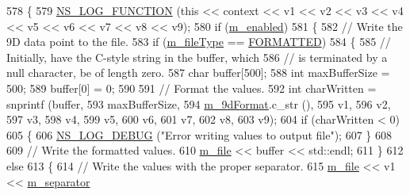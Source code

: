 \begin{DoxyCode}
578 \{
579   \hyperlink{log-macros-disabled_8h_a90b90d5bad1f39cb1b64923ea94c0761}{NS\_LOG\_FUNCTION} (\textcolor{keyword}{this} << context << v1 << v2 << v3 << v4 << v5 << v6 << v7 << v8 << v9);
580   \textcolor{keywordflow}{if} (\hyperlink{classns3_1_1DataCollectionObject_a3e8b0578f03044b1db4811ecff2be7ea}{m\_enabled})
581     \{
582       \textcolor{comment}{// Write the 9D data point to the file.}
583       \textcolor{keywordflow}{if} (\hyperlink{classns3_1_1FileAggregator_aa2a8abfe3082a802dc6705e701f73e9e}{m\_fileType} == \hyperlink{classns3_1_1FileAggregator_aedb3108205a498f7ac0c564508067e2da7e34fea5d3f680d09518ee58ce4711f0}{FORMATTED})
584         \{
585           \textcolor{comment}{// Initially, have the C-style string in the buffer, which}
586           \textcolor{comment}{// is terminated by a null character, be of length zero.}
587           \textcolor{keywordtype}{char} buffer[500];
588           \textcolor{keywordtype}{int} maxBufferSize = 500;
589           buffer[0] = 0;
590 
591           \textcolor{comment}{// Format the values.}
592           \textcolor{keywordtype}{int} charWritten = snprintf (buffer,
593                                       maxBufferSize,
594                                       \hyperlink{classns3_1_1FileAggregator_a8726cd1f40f4da37cdd544873b4ea583}{m\_9dFormat}.c\_str (),
595                                       v1,
596                                       v2,
597                                       v3,
598                                       v4,
599                                       v5,
600                                       v6,
601                                       v7,
602                                       v8,
603                                       v9);
604           \textcolor{keywordflow}{if} (charWritten < 0)
605             \{
606               \hyperlink{group__logging_ga413f1886406d49f59a6a0a89b77b4d0a}{NS\_LOG\_DEBUG} (\textcolor{stringliteral}{"Error writing values to output file"});
607             \}
608 
609           \textcolor{comment}{// Write the formatted values.}
610           \hyperlink{classns3_1_1FileAggregator_a756affa0d614724be513ceedcff62ac0}{m\_file} << buffer << std::endl;
611         \}
612       \textcolor{keywordflow}{else}
613         \{
614           \textcolor{comment}{// Write the values with the proper separator.}
615           \hyperlink{classns3_1_1FileAggregator_a756affa0d614724be513ceedcff62ac0}{m\_file} << v1 << \hyperlink{classns3_1_1FileAggregator_a1f74a4c07f663d535da56dfb70414a15}{m\_separator}

\end{DoxyCode}
